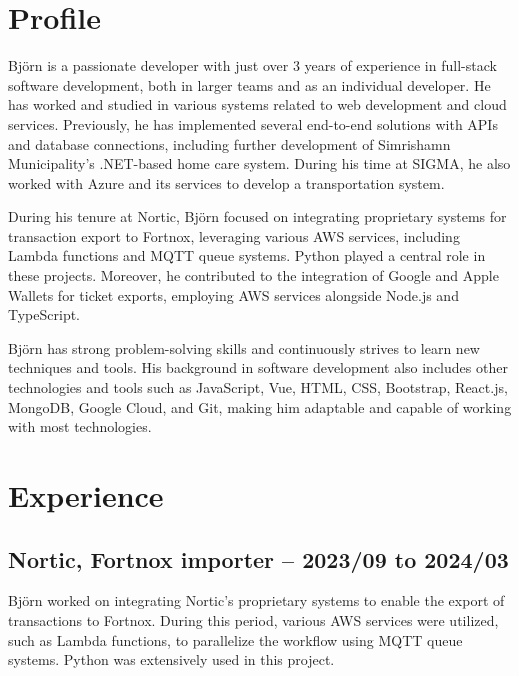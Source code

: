\documentclass{article}
\begin{document}
	\noindent
	\begin{minipage}[t]{0.7\textwidth}
		\vspace{-20pt} %
		\section*{\textcolor{colorBlue}{Profile}}
		Björn is a passionate developer with just over 3 years of experience in full-stack software development, both in larger teams and as an individual developer. He has worked and studied in various systems related to web development and cloud services. Previously, he has implemented several end-to-end solutions with APIs and database connections, including further development of Simrishamn Municipality's .NET-based home care system. During his time at SIGMA, he also worked with Azure and its services to develop a transportation system.
		
		\vspace{10pt}
		During his tenure at Nortic, Björn focused on integrating proprietary systems for transaction export to Fortnox, leveraging various AWS services, including Lambda functions and MQTT queue systems. Python played a central role in these projects.
		Moreover, he contributed to the integration of Google and Apple Wallets for ticket exports, employing AWS services alongside Node.js and TypeScript.
		
		\vspace{10pt}
		Björn has strong problem-solving skills and continuously strives to learn new techniques and tools. His background in software development also includes other technologies and tools such as JavaScript, Vue, HTML, CSS, Bootstrap, React.js, MongoDB, Google Cloud, and Git, making him adaptable and capable of working with most technologies.
		
		\vspace{10pt} %
		\section*{\textcolor{colorBlue}{Experience}}
		
		\subsection*{\textcolor{colorTitelErfarenhet}{Nortic, Fortnox importer – 2023/09 to 2024/03}}
		Björn worked on integrating Nortic's proprietary systems to enable the export of transactions to Fortnox. During this period, various AWS services were utilized, such as Lambda functions, to parallelize the workflow using MQTT queue systems. Python was extensively used in this project.
		

\end{minipage}
\end{document}
